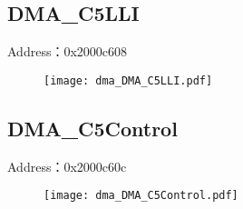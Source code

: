 \subsection{DMA\_C5LLI}
\label{dma-DMA-C5LLI}
Address：0x2000c608
 \begin{figure}[H]
\texttt{[image: dma\_DMA\_C5LLI.pdf]}
\end{figure}

\subsection{DMA\_C5Control}
\label{dma-DMA-C5Control}
Address：0x2000c60c
 \begin{figure}[H]
\texttt{[image: dma\_DMA\_C5Control.pdf]}
\end{figure}

